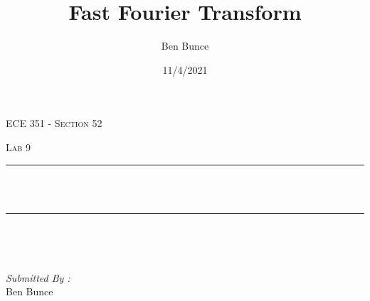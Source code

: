 \documentclass[12pt]{report}
\title{Fast Fourier Transform}
\author{Ben Bunce}
\date{11/4/2021}
\makeatletter
\let\thetitle\@title
\makeatother
\begin{document}

\begin{titlepage}
	\centering
    \vspace*{0.5 cm}
\begin{center}    \textsc{\Large   ECE 351 - Section 52}\\[2.0 cm]	\end{center}%
	\textsc{\Large Lab 9  }\\[0.5 cm]				%
	\rule{\linewidth}{0.2 mm} \\[0.4 cm]
	{ \huge \bfseries \thetitle}\\
	\rule{\linewidth}{0.2 mm} \\[1.5 cm]
	
	\begin{minipage}{0.4\textwidth}
		\begin{flushleft} \large
			\end{flushleft}
			\end{minipage}~
			\begin{minipage}{0.4\textwidth}
            
			\begin{flushright} \large
			\emph{Submitted By :} \\
			Ben Bunce  
		\end{flushright}
           
	\end{minipage}\\[2 cm]
	
    
    
    
    
	
\end{titlepage}


\tableofcontents
\pagebreak

\renewcommand{\thesection}{\arabic{section}}
\end{document}
